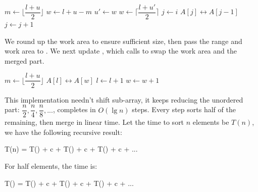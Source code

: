\documentclass[b5paper]{article}
\begin{document}
\begin{algorithmic}[1]
    \State $m \gets \lfloor \dfrac{l + u}{2} \rfloor$
    \State $w \gets l + u - m$
    \State {} 
      \State $u' \gets w$
      \State $w \gets \lceil \dfrac{l + u'}{2} \rceil$ 
      \State {} 
      \State {}
    \EndWhile
     
      \State $j \gets i$
        \State {} $A[j] \leftrightarrow A[j-1]$
        \State $j \gets j + 1$
      \EndWhile
    \EndFor
  \EndIf
\EndProcedure
\end{algorithmic}

We round up the work area to ensure sufficient size, then pass the range and work area to . We next update , which calls  to swap the work area and the merged part.

\begin{algorithmic}[1]
    \State $m \gets \lfloor \dfrac{l + u}{2} \rfloor$
    \State {}
    \State {}
    \State \Call{Merge}{$A, [l, m), [m+1, u), w$}
  \Else {}
      \State {} $A[l] \leftrightarrow A[w]$
      \State $l \gets l + 1$
      \State $w \gets w + 1$
    \EndWhile
  \EndIf
\EndProcedure
\end{algorithmic}

This implementation needn't shift sub-array, it keeps reducing the unordered part: $\dfrac{n}{2}, \dfrac{n}{4}, \dfrac{n}{8}, ...$, completes in $O(\lg n)$ steps. Every step sorts half of the remaining, then merge in linear time. Let the time to sort $n$ elements be $T(n)$, we have the following recursive result:

\be
T(n) = T() + c  + T() + c  + T() + c  + ...
\label{eq:in-place-sort-time}
\ee

For half elements, the time is:

\be
T() = T() + c  + T() + c  + T() + c  + ...
\label{eq:in-place-sort-time-half}
\ee
\end{document}
